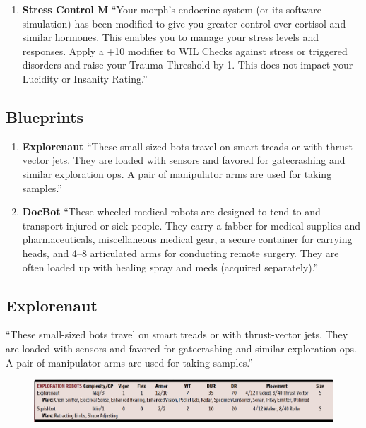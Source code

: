\begin{enumerate}
    \item \textbf{Stress Control M} “Your morph’s endocrine system (or its software simulation) has been modified to give you greater control over cortisol and similar hormones. This enables you to manage your stress levels and responses. Apply a +10 modifier to WIL Checks against stress or triggered disorders and raise your Trauma Threshold by 1. This does not impact your Lucidity or Insanity Rating.” \citep[pg. 323]{ep2e_1.1_2019}

\end{enumerate}


\subsection{Blueprints}

\begin{enumerate}

    \item \textbf{\gls{Explorenaut}} “These small-sized bots travel on smart treads or with thrust-vector jets. They are loaded with sensors and favored for gatecrashing and similar exploration ops. A pair of manipulator arms are used for taking samples.” \citep[pg. 347]{ep2e_1.1_2019}

    \item \textbf{\gls{DocBot}} “These wheeled medical robots are designed to tend to and transport injured or sick people. They carry a fabber for medical supplies and pharmaceuticals, miscellaneous medical gear, a secure container for carrying heads, and 4–8 articulated arms for conducting remote surgery. They are often loaded up with healing spray and meds (acquired separately).” \citep[pg. 347]{ep2e_1.1_2019}

\end{enumerate}


\subsection{Explorenaut}

“These small-sized bots travel on smart treads or with thrust-vector jets. They are loaded with sensors and favored for gatecrashing and similar exploration ops. A pair of manipulator arms are used for taking samples.” \citep[pg. 347]{ep2e_1.1_2019}

\begin{figure}[h]
    \includegraphics[width=\textwidth]{img/explorationRobots.png}
\end{figure}

